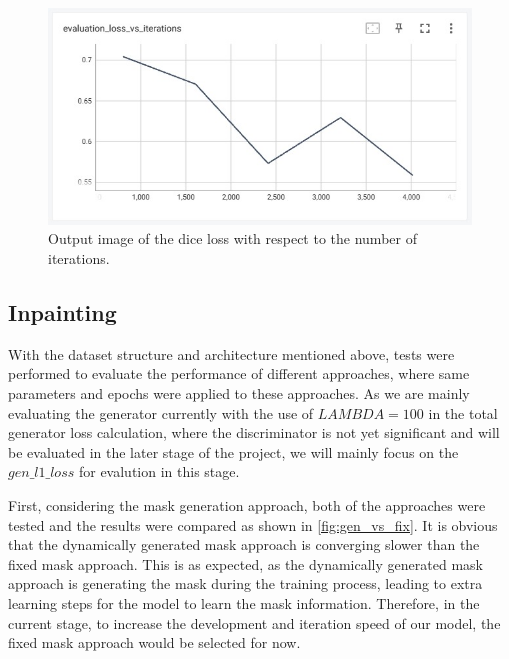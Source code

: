 \documentclass[10pt,twocolumn,letterpaper]{article}
\begin{document}
\begin{figure}[t]
    \centering
    \includegraphics[width=\linewidth]{figures/milestone/out_loss.jpg}
    \caption{Output image of the dice loss with respect to the number of iterations. }
    \label{fig:out_loss}
\end{figure}

\subsection{Inpainting}

With the dataset structure and architecture mentioned above, tests were performed to evaluate the performance of different approaches, where same parameters and epochs were applied to these 
approaches. As we are mainly evaluating the generator currently with the use of $LAMBDA = 100$ in the total generator loss calculation, where the discriminator is not yet significant and will be
evaluated in the later stage of the project, we will mainly focus on the $gen\_l1\_loss$ for evalution in this stage. 

First, considering the mask generation approach, both of the approaches were tested and the results were compared as shown in \cref{fig:gen_vs_fix}. It is obvious that the dynamically generated mask 
approach is converging slower than the fixed mask approach. This is as expected, as the dynamically generated mask approach is generating the mask during the training process, leading to extra learning
steps for the model to learn the mask information. Therefore, in the current stage, to increase the development and iteration speed of our model, the fixed mask approach would be selected for now.
\end{document}
